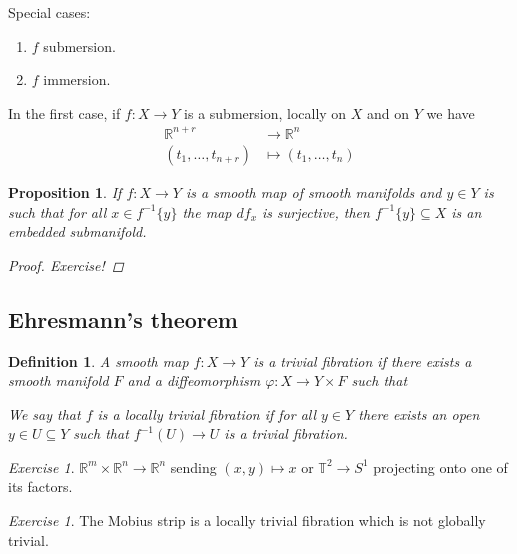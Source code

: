 \documentclass[12pt]{article}
\theoremstyle{darkgreentheorem}
\newtheorem{prop}[thm]{Proposition}
\theoremstyle{darkbluedefinition}
\newtheorem{defn}[thm]{Definition}
\theoremstyle{darkredexample}
\theoremstyle{remark}
\newtheorem{exe}[thm]{Exercise}
\newcommand{\R}{\mathbb{R}}
\newcommand{\1}{\mathbbm{1}}
\newcommand{\bbT}{\mathbb{T}}
\newcommand{\tms}{\times}
\newcommand{\sub}{\subseteq}
\begin{document}
Special cases:
\begin{enumerate}
    \item $f$ submersion.
    \item $f$ immersion.
\end{enumerate}

In the first case, if $f\colon X\to Y$ is a submersion, locally on $X$ and on $Y$ we have
\begin{align*}
    \R^{n+r} &\longrightarrow \R^{n} \\
    (t_{1},\ldots,t_{n+r})&\longmapsto (t_{1},\ldots,t_{n})
\end{align*}

\begin{prop}
    If $f\colon X\to Y$ is a smooth map of smooth manifolds and $y\in Y$ is such that for all $x\in f^{-1}\{y\}$ the map $df_{x}$ is surjective, then $f^{-1}\{y\}\sub X$ is an embedded submanifold.
    \begin{proof}
	Exercise!
    \end{proof}
\end{prop}

\subsection{Ehresmann's theorem}

\begin{defn}
    A smooth map $f\colon X\to Y$ is a \textit{trivial fibration} if there exists a smooth manifold $F$ and a diffeomorphism $\varphi\colon X\to Y\tms F$ such that
    \begin{center}
    \end{center}
    We say that $f$ is a \textit{locally trivial fibration} if for all $y\in Y$ there exists an open $y\in U\sub Y$ such that $f^{-1}(U)\to U$ is a trivial fibration.
\end{defn}

\begin{exe}
    $\R^{m}\tms \R^{n}\to \R^{n}$ sending $(x,y)\mapsto x$ or $\bbT^{2}\to S^{1}$ projecting onto one of its factors.
\end{exe}

\begin{exe}
    The Mobius strip is a locally trivial fibration which is not globally trivial.
\end{exe}
\end{document}
